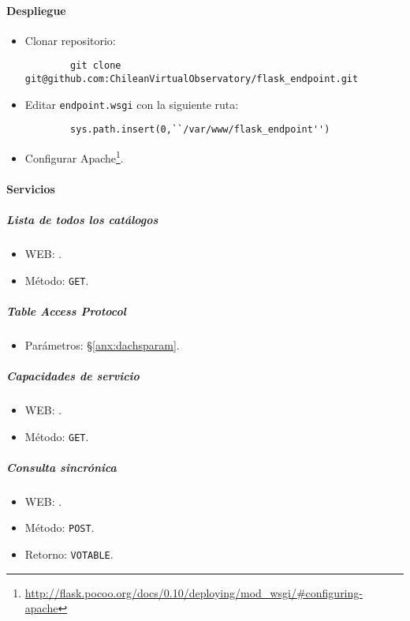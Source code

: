 \paragraph{Despliegue}

\begin{itemize}
	\item Clonar repositorio:
		\begin{verbatim}
		git clone git@github.com:ChileanVirtualObservatory/flask_endpoint.git
	\end{verbatim}
	\item Editar \verb;endpoint.wsgi; con la siguiente ruta:
		\begin{verbatim}
		sys.path.insert(0,``/var/www/flask_endpoint'')
	\end{verbatim}
	\item Configurar Apache\footnote{\url{http://flask.pocoo.org/docs/0.10/deploying/mod\_wsgi/\#configuring-apache}}.
\end{itemize}

\paragraph{Servicios}

\subparagraph{Lista de todos los catálogos}

\begin{itemize}
	\item WEB: \url{}.
	\item M\'etodo: \verb;GET;.
\end{itemize}

\subparagraph{\emph{Table Access Protocol}}

\begin{itemize}
	\item Parámetros: \S\ref{anx:dachsparam}.
\end{itemize}

\subparagraph{Capacidades de servicio}

\begin{itemize}
	\item WEB: \url{}.
	\item M\'etodo: \verb;GET;.
\end{itemize}

\subparagraph{Consulta sincrónica}

\begin{itemize}
	\item WEB: \url{}.
	\item M\'etodo: \verb;POST;.
	\item Retorno: \verb;VOTABLE;.
\end{itemize}

